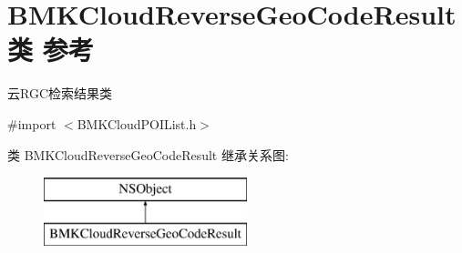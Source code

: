 \hypertarget{interface_b_m_k_cloud_reverse_geo_code_result}{}\section{B\+M\+K\+Cloud\+Reverse\+Geo\+Code\+Result类 参考}
\label{interface_b_m_k_cloud_reverse_geo_code_result}


云\+R\+G\+C检索结果类  




{\ttfamily \#import $<$B\+M\+K\+Cloud\+P\+O\+I\+List.\+h$>$}

类 B\+M\+K\+Cloud\+Reverse\+Geo\+Code\+Result 继承关系图\+:\begin{figure}[H]
\begin{center}
\leavevmode
\includegraphics[height=2.000000cm]{interface_b_m_k_cloud_reverse_geo_code_result}
\end{center}
\end{figure}
